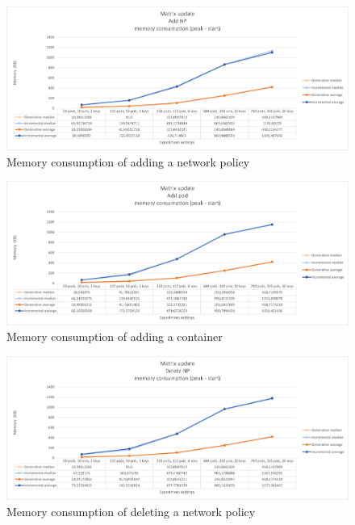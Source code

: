 \begin{figure}[H]
    \centering
    \includegraphics[width=\textwidth]{images/experiment1/addNP-memory.png}
    \caption{Memory consumption of adding a network policy}
    \label{fig:exp1-addNP-memory}
\end{figure}
\begin{figure}[H]
    \centering
    \includegraphics[width=\textwidth]{images/experiment1/addPod-memory.png}
    \caption{Memory consumption of adding a container}
    \label{fig:exp1-addPod-memory}
\end{figure}
\begin{figure}[H]
    \centering
    \includegraphics[width=\textwidth]{images/experiment1/delNP-memory.png}
    \caption{Memory consumption of deleting a network policy}
    \label{fig:exp1-delNP-memory}
\end{figure}
